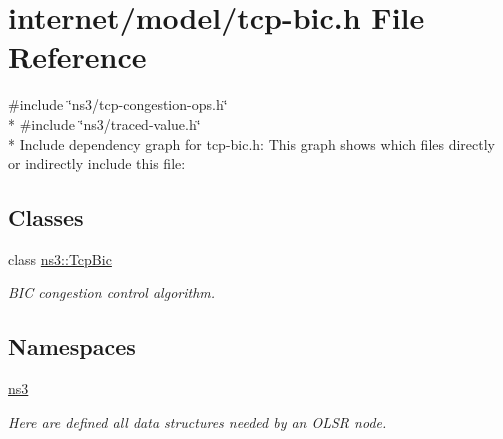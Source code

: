 \hypertarget{tcp-bic_8h}{}\section{internet/model/tcp-\/bic.h File Reference}
\label{tcp-bic_8h}
{\ttfamily \#include \char`\"{}ns3/tcp-\/congestion-\/ops.\+h\char`\"{}}\\*
{\ttfamily \#include \char`\"{}ns3/traced-\/value.\+h\char`\"{}}\\*
Include dependency graph for tcp-\/bic.h\+:
This graph shows which files directly or indirectly include this file\+:
\subsection*{Classes}
\begin{DoxyCompactItemize}
\item 
class \hyperlink{classns3_1_1TcpBic}{ns3\+::\+Tcp\+Bic}
\begin{DoxyCompactList}\small\item\em B\+IC congestion control algorithm. \end{DoxyCompactList}\end{DoxyCompactItemize}
\subsection*{Namespaces}
\begin{DoxyCompactItemize}
\item 
 \hyperlink{namespacens3}{ns3}
\begin{DoxyCompactList}\small\item\em Here are defined all data structures needed by an O\+L\+SR node. \end{DoxyCompactList}\end{DoxyCompactItemize}
